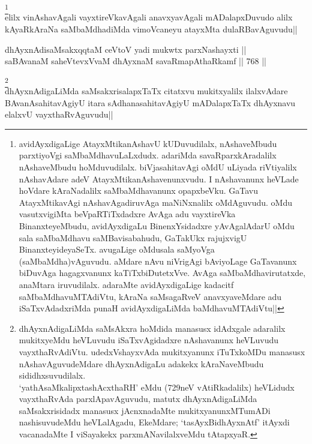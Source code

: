 \begin{artha} 
\footnote[1]{avidAyxdigaLige AtayxMtikanAshavU kUDuvudilalx, 
nAshaveMbudu parxtiyoVgi saMbaMdhavuLaLxdudx. adariMda 
savaRparxkAradalilx nAshaveMbudu hoMduvudilalx. biVjasahitavAgi oMdU 
uLiyada riVtiyalilx nAshavAdare adeV AtayxMtikanAshavenunxvudu. I 
nAshavanunx heVLade hoVdare kAraNadalilx saMbaMdhavanunx opapxbeVku. 
GaTavu AtayxMtikavAgi nAshavAgadiruvAga maNiNxnalilx oMdAguvudu. oMdu 
vasutxvigiMta beVpaRTiTxdadxre AvAga adu vayxtireVka BinanxteyeMbudu, 
avidAyxdigaLu BinenxYsidadxre yAvAgalAdarU oMdu sala saMbaMdhavu 
saMBavisabahudu, GaTakUkx rajujxvigU BinanxteyideyaSeTx. avugaLige 
oMdusala saMyoVga (saMbaMdha)vAguvudu. aMdare nAvu niVrigAgi 
bAviyoLage GaTavanunx biDuvAga hagagxvanunx kaTiTxbiDutetxVve. AvAga 
saMbaMdhavirutatxde, anaMtara iruvudilalx. adaraMte avidAyxdigaLige 
kadacitf saMbaMdhavuMTAdiVtu, kAraNa saMsagaRveV anavxyaveMdare adu 
iSaTxvAdadxriMda punaH avidAyxdigaLiMda baMdhavuMTAdiVtu||}\\
elilx vinAshavAgali vayxtireVkavAgali anavxyavAgali mADalapxDuvudo 
alilx kAyaRkAraNa saMbaMdhadiMda vimoVcaneyu atayxMta dulaRBavAguvudu||
\end{artha}


\begin{shl}
dhAyxnAdisaMsakxqqtaM ceVtoV yadi mukwtx parxNashayxti || \\
saBAvanaM saheVtevxVvaM dhAyxnaM savaRmapAthaRkamf ||  768 ||  
\end{shl}

\begin{artha} 
\footnote[2]{dhAyxnAdigaLiMda saMsAkxra hoMdida manasusx idAdxgale 
adaralilx mukitxyeMdu heVLuvudu iSaTxvAgidadxre nAshavanunx heVLuvudu 
vayxthaRvAdiVtu. udedxVshayxvAda mukitxyanunx iTuTxkoMDu manasusx 
nAshavAguvudeMdare dhAyxnAdigaLu adakekx kAraNaveMbudu 
sididhxsuvudilalx.\\
`yathAsaMkalipxtashAcxthaRH' eMdu (729neV vAtiRkadalilx) heVLidudx 
vayxthaRvAda parxlApavAguvudu, matutx dhAyxnAdigaLiMda saMsakxrisidadx 
manasusx jAcnxnadaMte mukitxyanunxMTumADi nashisuvudeMdu heVLalAgadu, 
EkeMdare; `tasAyxBidhAyxnAtf' itAyxdi vacanadaMte I viSayakekx 
parxmANavilalxveMdu tAtapxyaR.}\\
dhAyxnAdigaLiMda saMsakxrisalapxTaTx citatxvu mukitxyalilx ilalxvAdare 
BAvanAsahitavAgiyU itara sAdhanasahitavAgiyU mADalapxTaTx dhAyxnavu 
elalxvU vayxthaRvAguvudu||
\end{artha}

